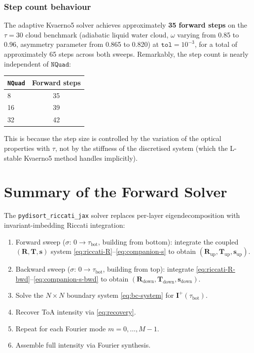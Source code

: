 \documentclass[11pt,a4paper]{article}
\newcommand{\vect}[1]{\bm{#1}}
\newcommand{\mat}[1]{\mathbf{#1}}
\newcommand{\tbot}{\tau_{\mathrm{bot}}}
\theoremstyle{definition}
\begin{document}
\subsubsection{Step count behaviour}\label{sec:step-count}

The adaptive Kvaerno5 solver achieves approximately \textbf{35 forward
steps} on the $\tau = 30$ cloud benchmark (adiabatic liquid water cloud,
$\omega$ varying from 0.85 to 0.96, asymmetry parameter from 0.865 to
0.820) at $\texttt{tol} = 10^{-3}$, for a total of approximately 65
steps across both sweeps.  Remarkably, the step count is nearly
independent of $\texttt{NQuad}$:
\begin{center}
\begin{tabular}{lc}
\toprule
\texttt{NQuad} & Forward steps \\
\midrule
8  & 35 \\
16 & 39 \\
32 & 42 \\
\bottomrule
\end{tabular}
\end{center}
This is because the step size is controlled by the variation of the
optical properties with $\tau$, not by the stiffness of the discretised
system (which the L-stable Kvaerno5 method handles implicitly).

\section{Summary of the Forward Solver}\label{sec:summary}

The \texttt{pydisort\_riccati\_jax} solver replaces per-layer
eigendecomposition with invariant-imbedding Riccati integration:
\begin{enumerate}[nosep]
  \item Forward sweep ($\sigma$: $0 \to \tbot$, building from bottom):
    integrate the coupled $(\mat{R}, \mat{T}, \vect{s})$ system
    \eqref{eq:riccati-R}--\eqref{eq:companion-s} to obtain
    $(\mat{R}_{\mathrm{up}}, \mat{T}_{\mathrm{up}}, \vect{s}_{\mathrm{up}})$.
  \item Backward sweep ($\sigma$: $0 \to \tbot$, building from top):
    integrate \eqref{eq:riccati-R-bwd}--\eqref{eq:companion-s-bwd} to
    obtain $(\mat{R}_{\mathrm{down}}, \mat{T}_{\mathrm{down}},
    \vect{s}_{\mathrm{down}})$.
  \item Solve the $N\!\times\!N$ boundary system \eqref{eq:bc-system}
    for $\vect{I}^+(\tbot)$.
  \item Recover ToA intensity via \eqref{eq:recovery}.
  \item Repeat for each Fourier mode $m = 0, \ldots, M-1$.
  \item Assemble full intensity via Fourier synthesis.
\end{enumerate}
\end{document}
